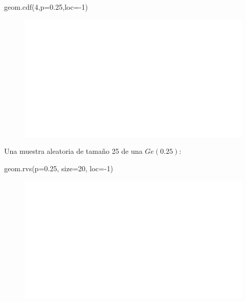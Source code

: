 \documentclass[
  letterpaper,
  DIV=11,
  numbers=noendperiod]{scrreprt}
\newenvironment{Shaded}{\begin{snugshade}}{\end{snugshade}}
\newcommand{\DecValTok}[1]{\textcolor[rgb]{0.68,0.00,0.00}{#1}}
\newcommand{\FloatTok}[1]{\textcolor[rgb]{0.68,0.00,0.00}{#1}}
\newcommand{\NormalTok}[1]{\textcolor[rgb]{0.00,0.23,0.31}{#1}}
\newcommand{\OperatorTok}[1]{\textcolor[rgb]{0.37,0.37,0.37}{#1}}
\begin{document}
\begin{Shaded}
\begin{Highlighting}[]
\NormalTok{geom.cdf(}\DecValTok{4}\NormalTok{,p}\OperatorTok{=}\FloatTok{0.25}\NormalTok{,loc}\OperatorTok{={-}}\DecValTok{1}\NormalTok{)}
\end{Highlighting}
\end{Shaded}

\begin{figure}[H]

{\centering \includegraphics{3_files/figure-pdf/py_geom_funciones3-7.pdf}

}

\end{figure}

Una muestra aleatoria de tamaño 25 de una \(Ge(0.25)\):

\begin{Shaded}
\begin{Highlighting}[]
\NormalTok{geom.rvs(p}\OperatorTok{=}\FloatTok{0.25}\NormalTok{, size}\OperatorTok{=}\DecValTok{20}\NormalTok{, loc}\OperatorTok{={-}}\DecValTok{1}\NormalTok{)}
\end{Highlighting}
\end{Shaded}

\begin{figure}[H]

{\centering \includegraphics{3_files/figure-pdf/py_random_binom-9.pdf}

}

\end{figure}
\end{document}
